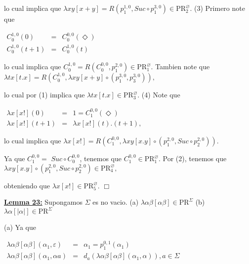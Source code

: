   lo cual implica que \(\lambda xy\left[ x+y\right] =R\left( p_{1}^{1,0},Suc\circ p_{1}^{3,0}\right) \in \mathrm{PR}_{2}^{\varnothing }.\)
  (3) Primero note que

  \(\displaystyle \begin{array}{rcl} C_{0}^{1,0}(0) & =& C_{0}^{0,0}(\Diamond ) \\ C_{0}^{1,0}(t+1) & =& C_{0}^{1,0}(t) \end{array} \)

  lo cual implica que \(C_{0}^{1,0}=R\left( C_{0}^{0,0},p_{1}^{2,0}\right) \in \mathrm{PR}_{1}^{\varnothing }.\) Tambien note que
  \(\displaystyle \lambda tx\left[ t.x\right] =R\left( C_{0}^{1,0},\lambda xy\left[ x+y\right] \circ \left( p_{1}^{3,0},p_{3}^{3,0}\right) \right) , \)

  lo cual por (1) implica que \(\lambda tx\left[ t.x\right] \in \mathrm{PR} _{3}^{\varnothing }\).
  (4) Note que

  \(\displaystyle \begin{array}{rcl} \lambda x\left[ x!\right] (0) & =& 1=C_{1}^{0,0}(\Diamond ) \\ \lambda x\left[ x!\right] (t+1) & =& \lambda x\left[ x!\right] (t).(t+1), \end{array} \)

  lo cual implica que
  \(\displaystyle \lambda x\left[ x!\right] =R\left( C_{1}^{0,0},\lambda xy\left[ x.y\right] \circ \left( p_{1}^{2,0},Suc\circ p_{2}^{2,0}\right) \right) . \)

  Ya que \(C_{1}^{0,0}=\) \(Suc\circ C_{0}^{0,0}\), tenemos que \(C_{1}^{0,0}\in \mathrm{PR}_{1}^{\varnothing }\). Por (2), tenemos que
  \(\displaystyle \lambda xy\left[ x.y\right] \circ \left( p_{1}^{2,0},Suc\circ p_{2}^{2,0}\right) \in \mathrm{PR}_{4}^{\varnothing }, \)

  obteniendo que \(\lambda x\left[ x!\right] \in \mathrm{PR}_{5}^{\varnothing }\). \(\Box\)


  \textbf{\underline{Lemma 23:}} Supongamos \(\Sigma \) es no vacio.
  (a) \(\lambda \alpha \beta \left[ \alpha \beta \right] \in \mathrm{PR} ^{\Sigma }\)
  (b) \(\lambda \alpha \left[ \left\vert \alpha \right\vert \right] \in \mathrm{PR}^{\Sigma }\)

  \PROOF (a) Ya que

  \(\displaystyle \begin{array}{rcl} \lambda \alpha \beta \left[ \alpha \beta \right] (\alpha _{1},\varepsilon ) & =& \alpha _{1}=p_{1}^{0,1}(\alpha _{1}) \\ \lambda \alpha \beta \left[ \alpha \beta \right] (\alpha _{1},\alpha a) & =& d_{a}(\lambda \alpha \beta \left[ \alpha \beta \right] (\alpha _{1},\alpha )),a\in \Sigma \end{array} \)

